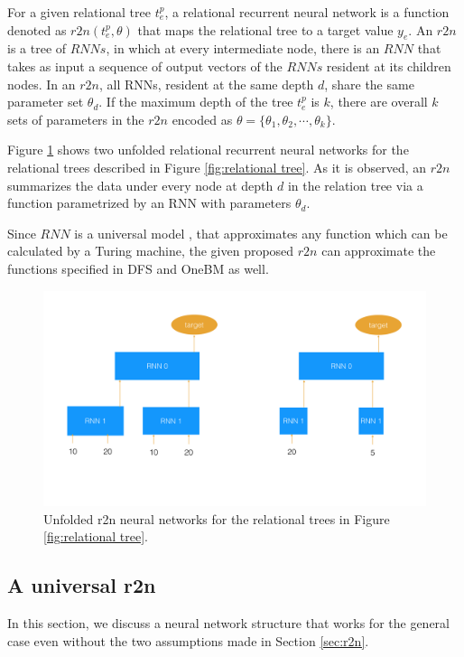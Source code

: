 \begin{definition} 
For a given relational tree $t^p_e$, a relational recurrent neural network is a function denoted as $r2n (t^p_e, \theta)$ that maps the relational tree to a target value $y_e$. An $r2n$ is a tree of $RNNs$, in which at every intermediate node, there is an $RNN$ that takes as input a sequence of output vectors of the $RNNs$ resident at its children nodes. In an $r2n$, all RNNs, resident at the same depth $d$, share the same parameter set $\theta_d$. If the maximum depth of the tree $t^p_e$ is $k$, there are overall $k$ sets of parameters in the $r2n$ encoded as $\theta = \{\theta_1, \theta_2, \cdots, \theta_k\}$.
\end{definition}

\begin{example}
\label{exp:r2n}
  Figure \ref{fig:r2n} shows two unfolded relational recurrent neural networks for the relational trees described in Figure \ref{fig:relational tree}. As it is observed, an $r2n$ summarizes the data under every node at depth $d$ in the relation tree via a function parametrized by an RNN with parameters $\theta_d$.
\end{example}

Since $RNN$ is a universal model \cite{universal}, that approximates any function which can be calculated by a Turing machine, the given proposed $r2n$ can approximate the functions specified in DFS and OneBM as well. 
\begin{figure}[tb]
    \centering
    \includegraphics[width=1.0\columnwidth]{./r2n.png}
    \caption{Unfolded r2n neural networks for the relational trees in Figure \ref{fig:relational tree}.}
    \label{fig:r2n}
\end{figure}   
\subsection{A universal r2n}
\label{sec:r2n universal}
In this section, we discuss a neural network structure that works for the general case even without the two assumptions made in Section \ref{sec:r2n}. 

